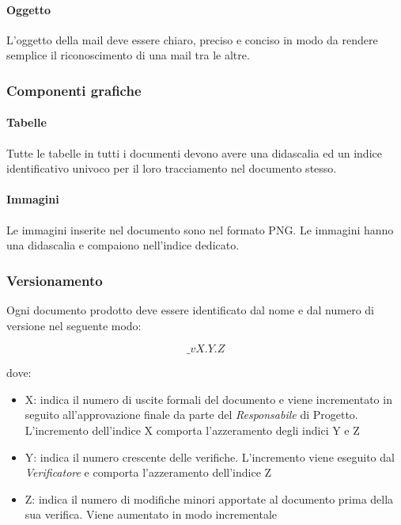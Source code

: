 \paragraph{Oggetto}

L’oggetto della mail deve essere chiaro, preciso e conciso in modo da rendere semplice il riconoscimento di una mail tra le altre.


\subsubsection{Componenti grafiche}

\paragraph{Tabelle }

Tutte le tabelle in tutti i documenti devono avere una didascalia ed
un indice identificativo univoco per il loro tracciamento nel
documento stesso. 

\paragraph{Immagini }

Le immagini inserite nel documento sono nel formato PNG. Le immagini hanno una didascalia e compaiono nell'indice dedicato.

\subsubsection{Versionamento}

Ogni documento prodotto deve essere identificato dal nome e dal numero di versione nel seguente modo:

$$ \_vX.Y.Z $$



dove:
\begin{itemize}
\item  X: indica il numero di uscite formali del documento e viene incrementato in seguito all’approvazione finale da parte del  \emph{Responsabile}  di Progetto.
L’incremento dell’indice X comporta l’azzeramento degli indici Y e Z

\item  Y: indica il numero crescente delle verifiche. L’incremento viene eseguito dal  \emph{Verificatore}  e comporta l’azzeramento dell’indice Z

\item  Z: indica il numero di modifiche minori apportate al documento prima della sua verifica. Viene aumentato in modo incrementale
\end{itemize}

